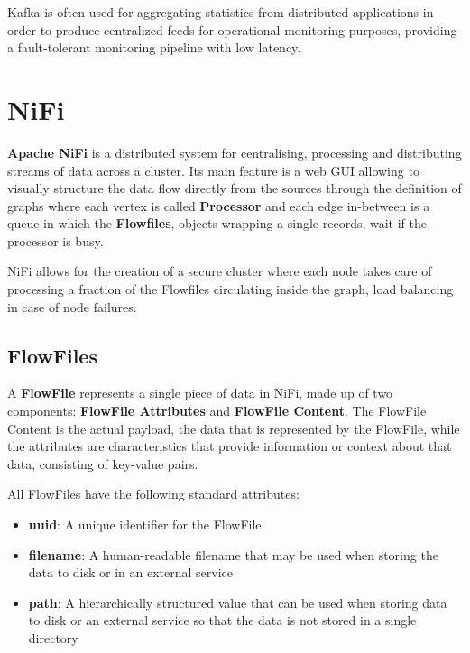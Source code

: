 Kafka is often used for aggregating statistics from distributed applications in order to produce centralized feeds for operational monitoring purposes, providing a fault-tolerant monitoring pipeline with low latency.


\section{NiFi}

\textbf{Apache NiFi} \cite{nifi_doc} is a distributed system for centralising, processing and distributing streams of data across a cluster. Its main feature is a web GUI allowing to visually structure the data flow directly from the sources through the definition of graphs where each vertex is called \textbf{Processor} and each edge in-between is a queue in which the \textbf{Flowfiles}, objects wrapping a single records, wait if the processor is busy.

NiFi allows for the creation of a secure cluster where each node takes care of processing a fraction of the Flowfiles circulating inside the graph, load balancing in case of node failures. 

\subsection{FlowFiles}

A \textbf{FlowFile} represents a single piece of data in NiFi, made up of two components: \textbf{FlowFile Attributes} and \textbf{FlowFile Content}. The FlowFile Content is the actual payload, the data that is represented by the FlowFile, while the attributes are characteristics that provide information or context about that data, consisting of key-value pairs. 

All FlowFiles have the following standard attributes:

\begin{itemize}
    \item \textbf{uuid}: A unique identifier for the FlowFile
    
    \item \textbf{filename}: A human-readable filename that may be used when storing the data to disk or in an external service
    
    \item \textbf{path}: A hierarchically structured value that can be used when storing data to disk or an external service so that the data is not stored in a single directory
\end{itemize}

